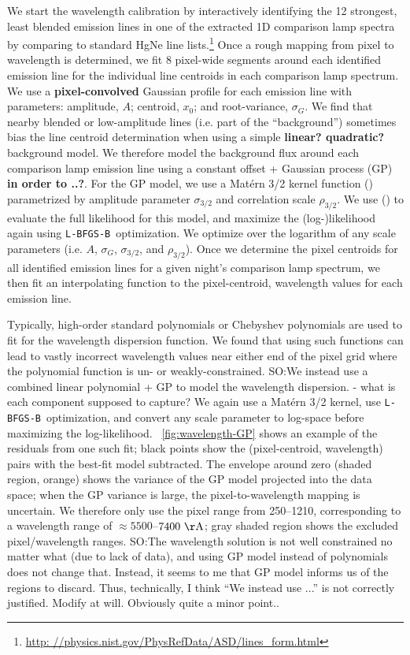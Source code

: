 \documentclass[modern, letterpaper]{aastex61}
\newcommand{\lbfgsb}{\texttt{L-BFGS-B}}
\newcommand{\smoh}[1]{\textcolor{mediumpersianblue}{SO:#1}}
\begin{document}
We start the wavelength calibration by interactively identifying the 12
strongest, least blended emission lines in one of the extracted 1D comparison
lamp spectra by comparing to standard HgNe line lists.\footnote{\url{http:
//physics.nist.gov/PhysRefData/ASD/lines_form.html}}
Once a rough mapping from pixel to wavelength is determined, we fit
8 pixel-wide segments around each identified emission line
for the individual line centroids in each comparison lamp spectrum.
We use a {\bf pixel-convolved} Gaussian profile for each emission line with
parameters: amplitude, $A$; centroid, $x_0$; and root-variance, $\sigma_G$.
We find that nearby blended or low-amplitude lines (i.e. part of the
``background'') sometimes bias the line centroid determination when using a
simple {\bf linear? quadratic?} background model.
We therefore model the background flux around each comparison lamp emission
line using a constant offset + Gaussian process (GP)
{\bf in order to ..?}.
For the GP model, we use a Mat\'ern 3/2 kernel function
(\citealt{Matern:1986,Rasmussen:2005}) parametrized by amplitude parameter
$\sigma_{3/2}$ and correlation scale $\rho_{3/2}$.
We use  (\citealt{Foreman-Mackey:2017}) to evaluate the full
likelihood for this model, and maximize the (log-)likelihood again using
\lbfgsb\ optimization.
We optimize over the logarithm of any scale parameters (i.e. $A$, $\sigma_G$,
$\sigma_{3/2}$, and $\rho_{3/2}$).
Once we determine the pixel centroids for all identified emission lines for a
given night's comparison lamp spectrum, we then fit an interpolating function
to the pixel-centroid, wavelength values for each emission line.

Typically, high-order standard polynomials or Chebyshev polynomials are used to
fit for the wavelength dispersion function.
We found that using such functions can lead to vastly incorrect wavelength
values near either end of the pixel grid where the polynomial function is
un- or weakly-constrained.
\smoh{We instead use a combined linear polynomial + GP to model the wavelength
  dispersion. - what is each component supposed to capture?}
We again use a Mat\'ern 3/2 kernel, use \lbfgsb\ optimization, and convert any
scale parameter to log-space before maximizing the log-likelihood.
\figurename~\ref{fig:wavelength-GP} shows an example of the residuals from one
such fit; black points show the (pixel-centroid, wavelength) pairs with the
best-fit model subtracted.
The envelope around zero (shaded region, orange) shows the variance of the GP
model projected into the data space; when the GP variance is large, the
pixel-to-wavelength mapping is uncertain.
We therefore only use the pixel range from 250--1210, corresponding to a
wavelength range of $\approx 5500$--$7400~{\rm \AA}$; gray shaded region shows
the excluded pixel/wavelength ranges.
\smoh{The wavelength solution is not well constrained no matter what (due to
  lack of data), and using GP model instead of polynomials does not change
  that. Instead, it seems to me that GP model informs us of the regions to
  discard.  Thus, technically, I think ``We instead use ...'' is not correctly
  justified. Modify at will. Obviously quite a minor point..}
\end{document}
